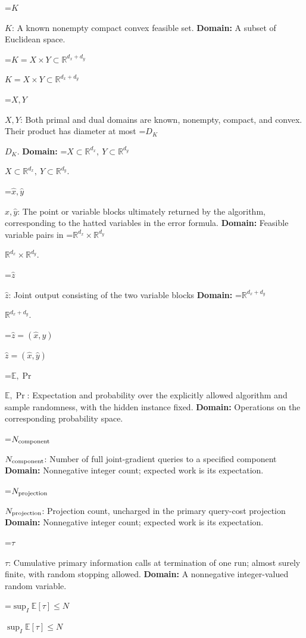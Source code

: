\documentclass[10pt,a4paper]{article}
\newcommand{\AtlasMath}[1]{\par\begingroup\centering\setbox0=\hbox{$\displaystyle #1$}\ifdim\wd0>1.4\linewidth\typeout{ATLAS WIDE FORMULA: \the\wd0}\fi\ifdim\wd0>\linewidth\resizebox{\linewidth}{!}{\box0}\else\box0\fi\par\endgroup}
\newcommand{\AtlasInlineMath}[1]{\begingroup\setbox0=\hbox{$#1$}\ifdim\wd0>.4\linewidth\endgroup\AtlasMath{#1}\else\endgroup$#1$\fi}
\begin{document}
\AtlasInlineMath{K}: A known nonempty compact convex feasible set. \textbf{Domain:} A subset of Euclidean space.



\AtlasInlineMath{K=X\times Y\subset\mathbb R^{d_x+d_y}}



\AtlasInlineMath{X,Y}: Both primal and dual domains are known, nonempty, compact, and convex. Their product has diameter at most \AtlasInlineMath{D_K}. \textbf{Domain:} \AtlasInlineMath{X\subset\mathbb R^{d_x},\ Y\subset\mathbb R^{d_y}}.



\AtlasInlineMath{\widehat x,\widehat y}: The point or variable blocks ultimately returned by the algorithm, corresponding to the hatted variables in the error formula. \textbf{Domain:} Feasible variable pairs in \AtlasInlineMath{\mathbb R^{d_x}\times\mathbb R^{d_y}}.



\AtlasInlineMath{\widehat z}: Joint output consisting of the two variable blocks \textbf{Domain:} \AtlasInlineMath{\mathbb R^{d_x+d_y}}.



\AtlasInlineMath{\widehat z=(\widehat x,\widehat y)}



\AtlasInlineMath{\mathbb E,\Pr}: Expectation and probability over the explicitly allowed algorithm and sample randomness, with the hidden instance fixed. \textbf{Domain:} Operations on the corresponding probability space.



\AtlasInlineMath{N_{\rm component}}: Number of full joint-gradient queries to a specified component \textbf{Domain:} Nonnegative integer count; expected work is its expectation.



\AtlasInlineMath{N_{\rm projection}}: Projection count, uncharged in the primary query-cost projection \textbf{Domain:} Nonnegative integer count; expected work is its expectation.



\AtlasInlineMath{\tau}: Cumulative primary information calls at termination of one run; almost surely finite, with random stopping allowed. \textbf{Domain:} A nonnegative integer-valued random variable.



\AtlasInlineMath{\sup_I\mathbb E[\tau]\le N}
\end{document}

